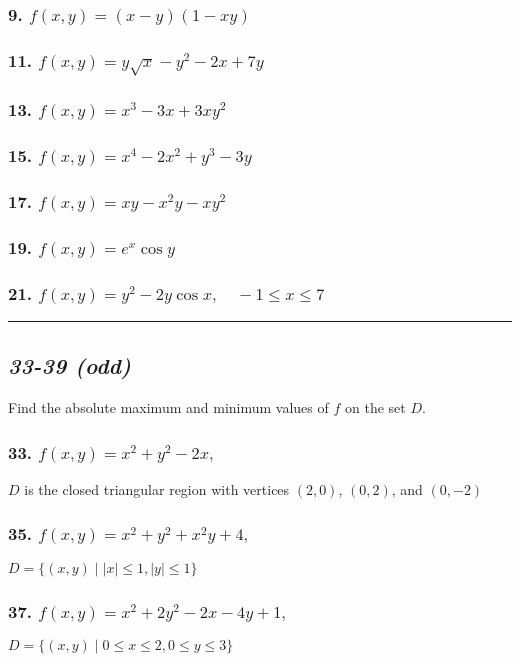 \documentclass{article}
\newcommand{\such}{\; | \;}
\newcommand{\spc}{\vspace{1em}\hrule\vspace{1em}}
\begin{document}
\subsubsection*{9. $f(x,y)=(x-y)(1-xy)$}
\subsubsection*{11. $f(x,y)=y\sqrt x -y^2-2x+7y$}
\subsubsection*{13. $f(x,y)=x^3-3x+3xy^2$}
\subsubsection*{15. $f(x,y)=x^4 - 2x^2+y^3-3y$}
\subsubsection*{17. $f(x,y)=xy-x^2y-xy^2$}
\subsubsection*{19. $f(x,y)=e^x\cos y$}
\subsubsection*{21. $f(x,y)=y^2-2y\cos x,\quad -1 \leq x \leq 7$}
\spc
\begin{center}
    \subsection*{\textit{33-39 (odd)}} 
    Find the absolute maximum and minimum values of $f$ on the set $D$.
\end{center}
\subsubsection*{33. $f(x,y) = x^2+y^2-2x,\quad$}
$D$ is the closed triangular
region with vertices $(2,0)$, $(0,2)$, and $(0,-2)$
\subsubsection*{35. $f(x,y)=x^2+y^2+x^2y+4,$} 
$D = \{(x,y)\such |x| \leq 1, |y| \leq 1\}$
\subsubsection*{37. $f(x,y)=x^2+2y^2-2x-4y+1,$}
$D = \{(x,y)\such 0\leq x \leq 2,0 \leq y \leq 3\}$
\end{document}
